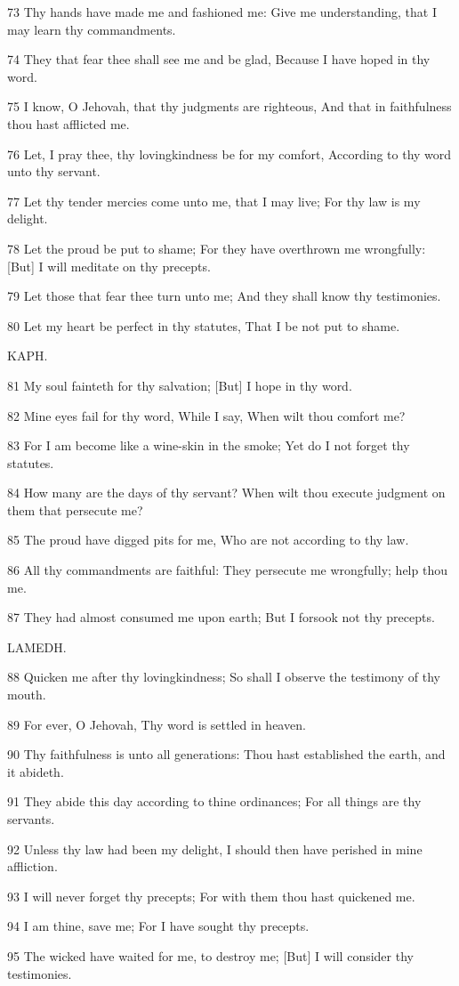 \par 73 Thy hands have made me and fashioned me: Give me understanding, that I may learn thy commandments.
\par 74 They that fear thee shall see me and be glad, Because I have hoped in thy word.
\par 75 I know, O Jehovah, that thy judgments are righteous, And that in faithfulness thou hast afflicted me.
\par 76 Let, I pray thee, thy lovingkindness be for my comfort, According to thy word unto thy servant.
\par 77 Let thy tender mercies come unto me, that I may live; For thy law is my delight.
\par 78 Let the proud be put to shame; For they have overthrown me wrongfully: [But] I will meditate on thy precepts.
\par 79 Let those that fear thee turn unto me; And they shall know thy testimonies.
\par 80 Let my heart be perfect in thy statutes, That I be not put to shame.

\par KAPH.

\par 81 My soul fainteth for thy salvation; [But] I hope in thy word.
\par 82 Mine eyes fail for thy word, While I say, When wilt thou comfort me?
\par 83 For I am become like a wine-skin in the smoke; Yet do I not forget thy statutes.
\par 84 How many are the days of thy servant? When wilt thou execute judgment on them that persecute me?
\par 85 The proud have digged pits for me, Who are not according to thy law.
\par 86 All thy commandments are faithful: They persecute me wrongfully; help thou me.
\par 87 They had almost consumed me upon earth; But I forsook not thy precepts.

\par LAMEDH.

\par 88 Quicken me after thy lovingkindness; So shall I observe the testimony of thy mouth.
\par 89 For ever, O Jehovah, Thy word is settled in heaven.
\par 90 Thy faithfulness is unto all generations: Thou hast established the earth, and it abideth.
\par 91 They abide this day according to thine ordinances; For all things are thy servants.
\par 92 Unless thy law had been my delight, I should then have perished in mine affliction.
\par 93 I will never forget thy precepts; For with them thou hast quickened me.
\par 94 I am thine, save me; For I have sought thy precepts.
\par 95 The wicked have waited for me, to destroy me; [But] I will consider thy testimonies.

